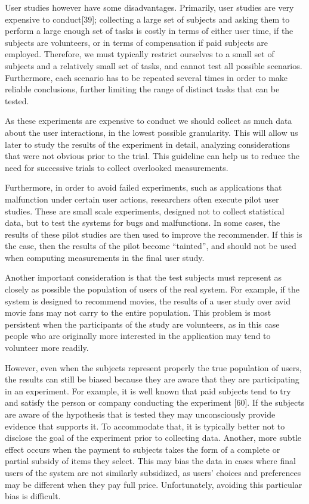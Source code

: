 User studies however have some disadvantages. Primarily, user studies are very expensive to conduct[39]; collecting a large set of subjects and asking them to perform a large enough set of tasks is costly in terms of either user time, if the subjects are volunteers, or in terms of compensation if paid subjects are employed. Therefore, we must typically restrict ourselves to a small set of subjects and a relatively small set of tasks, and cannot test all possible scenarios. Furthermore, each scenario has to be repeated several times in order to make reliable conclusions, further limiting the range of distinct tasks that can be tested.

As these experiments are expensive to conduct we should collect as much data about the user interactions, in the lowest possible granularity. This will allow us later to study the results of the experiment in detail, analyzing considerations that were not obvious prior to the trial. This guideline can help us to reduce the need for successive trials to collect overlooked measurements.

Furthermore, in order to avoid failed experiments, such as applications that malfunction under certain user actions, researchers often execute pilot user studies. These are small scale experiments, designed not to collect statistical data, but to test the systems for bugs and malfunctions. In some cases, the results of these pilot studies are then used to improve the recommender. If this is the case, then the results of the pilot become “tainted”, and should not be used when computing measurements in the final user study.

Another important consideration is that the test subjects must represent as closely as possible the population of users of the real system. For example, if the system is designed to recommend movies, the results of a user study over avid movie fans may not carry to the entire population. This problem is most persistent when the participants of the study are volunteers, as in this case people who are originally more interested in the application may tend to volunteer more readily.

However, even when the subjects represent properly the true population of users, the results can still be biased because they are aware that they are participating in an experiment. For example, it is well known that paid subjects tend to try and satisfy the person or company conducting the experiment [60]. If the subjects are aware of the hypothesis that is tested they may unconsciously provide evidence that supports it. To accommodate that, it is typically better not to disclose the goal of the experiment prior to collecting data. Another, more subtle effect occurs when the payment to subjects takes the form of a complete or partial subsidy of items they select. This may bias the data in cases where final users of the system are not similarly subsidized, as users’ choices and preferences may be different when they pay full price. Unfortunately, avoiding this particular bias is difficult.

